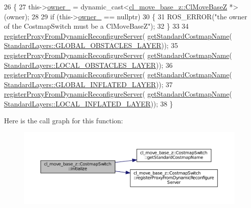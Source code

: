 \begin{DoxyCode}
26 \{
27     this->\hyperlink{classcl__move__base__z_1_1CostmapSwitch_a42a7da3f7301daa691ef1593ae926618}{owner\_} = \textcolor{keyword}{dynamic\_cast<}\hyperlink{classcl__move__base__z_1_1ClMoveBaseZ}{cl\_move\_base\_z::ClMoveBaseZ} *\textcolor{keyword}{>}(owner);
28 
29     \textcolor{keywordflow}{if} (this->\hyperlink{classcl__move__base__z_1_1CostmapSwitch_a42a7da3f7301daa691ef1593ae926618}{owner\_} == \textcolor{keyword}{nullptr})
30     \{
31         ROS\_ERROR(\textcolor{stringliteral}{"the owner of the CostmapSwitch must be a ClMoveBaseZ"});
32     \}
33 
34     \hyperlink{classcl__move__base__z_1_1CostmapSwitch_a0d04ca7b655f850ba3107393f1c437cb}{registerProxyFromDynamicReconfigureServer}(
      \hyperlink{classcl__move__base__z_1_1CostmapSwitch_ac46796874242fdaa7efef86b66a55102}{getStandardCostmapName}(
      \hyperlink{classcl__move__base__z_1_1CostmapSwitch_af38aeee5e3893e689cd74ddddfe0df15a94404229e09ab748aab0096bd5ff3656}{StandardLayers::GLOBAL\_OBSTACLES\_LAYER}));
35     \hyperlink{classcl__move__base__z_1_1CostmapSwitch_a0d04ca7b655f850ba3107393f1c437cb}{registerProxyFromDynamicReconfigureServer}(
      \hyperlink{classcl__move__base__z_1_1CostmapSwitch_ac46796874242fdaa7efef86b66a55102}{getStandardCostmapName}(
      \hyperlink{classcl__move__base__z_1_1CostmapSwitch_af38aeee5e3893e689cd74ddddfe0df15aff8d30cf6ceac8551691e28c328aebe6}{StandardLayers::LOCAL\_OBSTACLES\_LAYER}));
36     \hyperlink{classcl__move__base__z_1_1CostmapSwitch_a0d04ca7b655f850ba3107393f1c437cb}{registerProxyFromDynamicReconfigureServer}(
      \hyperlink{classcl__move__base__z_1_1CostmapSwitch_ac46796874242fdaa7efef86b66a55102}{getStandardCostmapName}(
      \hyperlink{classcl__move__base__z_1_1CostmapSwitch_af38aeee5e3893e689cd74ddddfe0df15a1757575ee674622adfb325de182a65d6}{StandardLayers::GLOBAL\_INFLATED\_LAYER}));
37     \hyperlink{classcl__move__base__z_1_1CostmapSwitch_a0d04ca7b655f850ba3107393f1c437cb}{registerProxyFromDynamicReconfigureServer}(
      \hyperlink{classcl__move__base__z_1_1CostmapSwitch_ac46796874242fdaa7efef86b66a55102}{getStandardCostmapName}(
      \hyperlink{classcl__move__base__z_1_1CostmapSwitch_af38aeee5e3893e689cd74ddddfe0df15aab9e94e9dc4c62e74e48ee34b11c8807}{StandardLayers::LOCAL\_INFLATED\_LAYER}));
38 \}
\end{DoxyCode}


Here is the call graph for this function\+:
\nopagebreak
\begin{figure}[H]
\begin{center}
\leavevmode
\includegraphics[width=350pt]{classcl__move__base__z_1_1CostmapSwitch_af629ac6f390f90c0b6ad1008fa6b2586_cgraph}
\end{center}
\end{figure}


